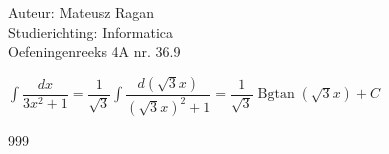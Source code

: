 \documentclass[a4paper]{article}
\begin{document}
\noindent \large Auteur: Mateusz Ragan \\
\noindent \large Studierichting: Informatica\\
\noindent \large Oefeningenreeks 4A nr. 36.9\\

\medskip

\normalsize

$\displaystyle\int \dfrac{dx}{3x^2 +1} = \dfrac{1}{\sqrt{3} }\displaystyle\int \dfrac{d(\sqrt{3}x)}{(\sqrt{3}x)^2 +1} = \dfrac{1}{\sqrt{3}} \operatorname{Bgtan}(\sqrt{3}x)+C$

\begin{thebibliography}{999}
\end{thebibliography}
\end{document}

